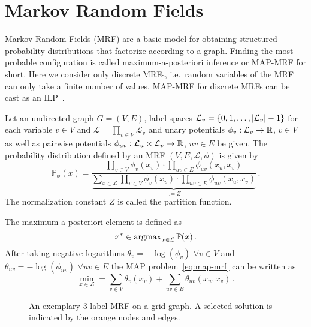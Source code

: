 \section{Markov Random Fields}
\label{sec:mrf}
Markov Random Fields (MRF) are a basic model for obtaining structured probability distributions that factorize according to a graph.
Finding the most probable configuration is called maximum-a-posteriori inference or MAP-MRF for short.
Here we consider only discrete MRFs, i.e.\ random variables of the MRF can only take a finite number of values.
MAP-MRF for discrete MRFs can be cast as an ILP~\cite{werner2007linear}.


\begin{definition}[MRF]
    \label{def:mrf}
Let an undirected graph $G=(V,E)$, label spaces $\mathcal{L}_v = \{0,1,\ldots, \lvert\mathcal{L}_v\rvert-1\}$ for each variable $v \in V$ and $\mathcal{L} = \prod_{v \in V} \mathcal{L}_v$ and 
unary potentials $\phi_v : \mathcal{L}_v \rightarrow \mathbb{R}$, $v \in V$ as well as pairwise potentials
$\phi_{uv} : \mathcal{L}_u \times \mathcal{L}_v \rightarrow \mathbb{R}$, $uv \in E$ be given.
The probability distribution defined by an MRF $(V,E,\mathcal{L},\phi)$ is given by
\begin{equation}
\mathbb{P}_{\phi}(x) = \frac{\prod_{v \in V} \phi_v(x_v) \cdot \prod_{uv \in E} \phi_{uv}(x_u,x_v)}{ \underbrace{\sum_{x \in \mathcal{L}} \prod_{v \in V} \phi_v(x_v) \cdot \prod_{uv \in E} \phi_{uv}(x_u,x_v)}_{ := Z } } \,.
\end{equation}
The normalization constant $Z$ is called the partition function.
\end{definition}

\begin{definition}[MAP]
The maximum-a-posteriori element is defined as
\begin{equation}
\label{eq:map-mrf}
x^* \in \operatorname{argmax}_{x \in \mathcal{L}} \mathbb{P}(x)\,.
\end{equation}
After taking negative logarithms $\theta_v = - \log(\phi_v)$ $\forall v \in V$ and $\theta_{uv} = -\log(\phi_{uv})$ $\forall uv \in E$ the MAP problem~\eqref{eq:map-mrf} can be written as
\begin{equation}
\min_{x \in \mathcal{L}} = \sum_{v \in V} \theta_v(x_v) + \sum_{uv \in E} \theta_{uv}(x_u,x_v) \,.
\end{equation}
\end{definition}

\begin{figure}[H]
    \centering
    
    \caption{
    An exemplary 3-label MRF on a grid graph.
    A selected solution is indicated by the orange nodes and edges.
    }
    \label{fig:mrf-illustration}
\end{figure}

